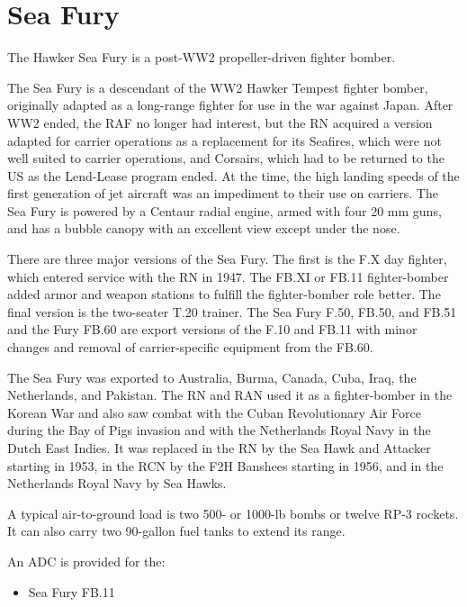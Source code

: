\section*{Sea Fury}

The Hawker Sea Fury is a post-WW2 propeller-driven fighter bomber. 

The Sea Fury is a descendant of the WW2 Hawker Tempest fighter bomber, originally adapted as a long-range fighter for use in the war against Japan. After WW2 ended, the RAF no longer had interest, but the RN acquired a version adapted for carrier operations as a replacement for its Seafires, which were not well suited to carrier operations, and Corsairs, which had to be returned to the US as the Lend-Lease program ended. At the time, the high landing speeds of the first generation of jet aircraft was an impediment to their use on carriers. The Sea Fury is powered by a Centaur radial engine, armed with four 20 mm guns, and has a bubble canopy with an excellent view except under the nose.

There are three major versions of the Sea Fury. The first is the F.X day fighter, which entered service with the RN in 1947. The FB.XI or FB.11 fighter-bomber added armor and weapon stations to fulfill the fighter-bomber role better. The final version is the two-seater T.20 trainer. The Sea Fury F.50, FB.50, and FB.51 and the Fury FB.60 are export versions of the F.10 and FB.11 with minor changes and removal of carrier-specific equipment from the FB.60. 

The Sea Fury was exported to Australia, Burma, Canada, Cuba, Iraq, the Netherlands, and Pakistan. The RN and RAN used it as a fighter-bomber in the Korean War and also saw combat with the Cuban Revolutionary Air Force during the Bay of Pigs invasion and with the Netherlands Royal Navy in the Dutch East Indies. It was replaced in the RN by the Sea Hawk and Attacker starting in 1953, in the RCN by the F2H Banshees starting in 1956, and in the Netherlands Royal Navy by Sea Hawks.

A typical air-to-ground load is two 500- or 1000-lb bombs or twelve RP-3 rockets. It can also carry two 90-gallon fuel tanks to extend its range.

An ADC is provided for the:
\begin{itemize}
\item Sea Fury FB.11
\end{itemize}

